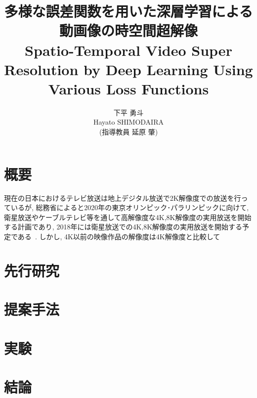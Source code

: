 \documentclass[twocolumn,a4j,uplatex]{jsarticle}
\title{{\Large 多様な誤差関数を用いた深層学習による動画像の時空間超解像} \\
Spatio-Temporal Video Super Resolution by Deep Learning Using Various Loss Functions}
\author{{\Large 下平 勇斗} \\ Hayato SHIMODAIRA \\ (指導教員 延原 肇)}
\begin{document}
\maketitle
\thispagestyle{headings}
\section{概要}
現在の日本におけるテレビ放送は地上デジタル放送で2K解像度での放送を行っているが,
総務省によると2020年の東京オリンピック･パラリンピックに向けて,
衛星放送やケーブルテレビ等を通して高解像度な4K,8K解像度の実用放送を開始する計画であり,
2018年には衛星放送での4K,8K解像度の実用放送を開始する予定である~\cite{soumu}.
しかし, 4K以前の映像作品の解像度は4K解像度と比較して


\section{先行研究}
\section{提案手法}
\section{実験}
\section{結論}



\end{document}
